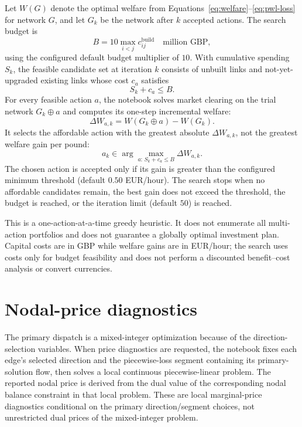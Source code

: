 \documentclass[11pt]{article}
\begin{document}
Let \(W(G)\) denote the optimal welfare from
Equations~\ref{eq:welfare}--\ref{eq:pwl-loss} for network \(G\), and let
\(G_k\) be the network after \(k\) accepted actions. The search budget is
\begin{equation}
B = 10\max_{i<j} c^{\mathrm{build}}_{ij}
\quad\text{million GBP},
\label{eq:budget}
\end{equation}
using the configured default budget multiplier of \(10\). With cumulative
spending \(S_k\), the feasible candidate set at iteration \(k\) consists of
unbuilt links and not-yet-upgraded existing links whose cost \(c_a\) satisfies
\[
S_k+c_a\le B.
\]
For every feasible action \(a\), the notebook solves market clearing on the
trial network \(G_k\oplus a\) and computes its one-step incremental welfare:
\begin{equation}
\Delta W_{a,k}=W(G_k\oplus a)-W(G_k).
\end{equation}
It selects the affordable action with the greatest absolute \(\Delta W_{a,k}\),
not the greatest welfare gain per pound:
\begin{equation}
a_k\in\arg\max_{a:\,S_k+c_a\le B}\Delta W_{a,k}.
\end{equation}
The chosen action is accepted only if its gain is greater than the configured
minimum threshold (default \(0.50\) EUR/hour). The search stops when no
affordable candidates remain, the best gain does not exceed the threshold, the
budget is reached, or the iteration limit (default \(50\)) is reached.

This is a one-action-at-a-time greedy heuristic. It does not enumerate all
multi-action portfolios and does not guarantee a globally optimal investment
plan. Capital costs are in GBP while welfare gains are in EUR/hour; the search
uses costs only for budget feasibility and does not perform a discounted
benefit--cost analysis or convert currencies.

\section{Nodal-price diagnostics}

The primary dispatch is a mixed-integer optimization because of the
direction-selection variables. When price diagnostics are requested, the
notebook fixes each edge's selected direction and the piecewise-loss segment
containing its primary-solution flow, then solves a local continuous
piecewise-linear problem. The reported nodal price is derived from the dual
value of the corresponding nodal balance constraint in that local problem.
These are local marginal-price diagnostics conditional on the primary
direction/segment choices, not unrestricted dual prices of the mixed-integer
problem.
\end{document}
